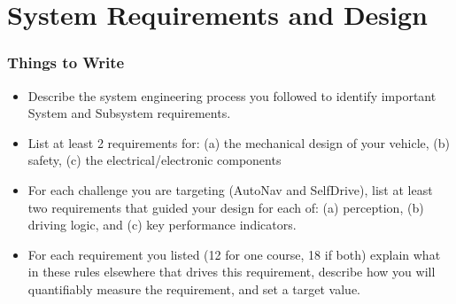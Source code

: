 \section{System Requirements and Design}
\subsubsection*{Things to Write}

\begin{itemize}
  \item Describe the system engineering process you followed to identify important System and Subsystem requirements.
  \item List at least 2 requirements for: (a) the mechanical design of your vehicle, (b) safety, (c) the electrical/electronic components
  \item For each challenge you are targeting (AutoNav and SelfDrive), list at least two requirements that guided your design for each of: (a) perception, (b) driving logic, and (c) key performance indicators.
  \item For each requirement you listed (12 for one course, 18 if both) explain what in these rules elsewhere that drives this requirement, describe how you will quantifiably measure the requirement, and set a target value.
\end{itemize}

